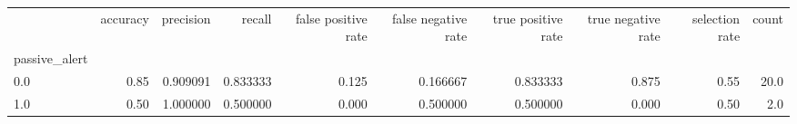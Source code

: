 \begin{tabular}{lrrrrrrrrr}
\toprule
{} &  accuracy &  precision &    recall &  false positive rate &  false negative rate &  true positive rate &  true negative rate &  selection rate &  count \\
passive\_alert &           &            &           &                      &                      &                     &                     &                 &        \\
\midrule
0.0           &      0.85 &   0.909091 &  0.833333 &                0.125 &             0.166667 &            0.833333 &               0.875 &            0.55 &   20.0 \\
1.0           &      0.50 &   1.000000 &  0.500000 &                0.000 &             0.500000 &            0.500000 &               0.000 &            0.50 &    2.0 \\
\bottomrule
\end{tabular}
